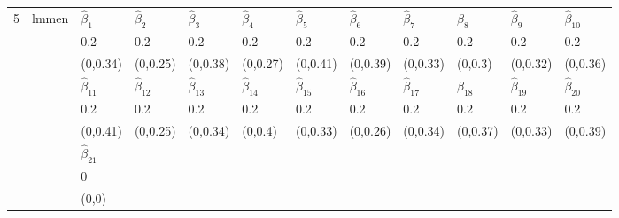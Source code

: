 \begin{table}[ht]
\centering
\begin{tabular}{llllllllllll}
  \hline
  \hline
\multirow{9}{*}{5} & \multirow{9}{*}{lmmen} & $\hat{\beta}_{1}$ & $\hat{\beta}_{2}$ & $\hat{\beta}_{3}$ & $\hat{\beta}_{4}$ & $\hat{\beta}_{5}$ & $\hat{\beta}_{6}$ & $\hat{\beta}_{7}$ & $\hat{\beta}_{8}$ & $\hat{\beta}_{9}$ & $\hat{\beta}_{10}$ \\ 
   &  & 0.2 & 0.2 & 0.2 & 0.2 & 0.2 & 0.2 & 0.2 & 0.2 & 0.2 & 0.2 \\ 
   &  & (0,0.34) & (0,0.25) & (0,0.38) & (0,0.27) & (0,0.41) & (0,0.39) & (0,0.33) & (0,0.3) & (0,0.32) & (0,0.36) \\ 
   &  & $\hat{\beta}_{11}$ & $\hat{\beta}_{12}$ & $\hat{\beta}_{13}$ & $\hat{\beta}_{14}$ & $\hat{\beta}_{15}$ & $\hat{\beta}_{16}$ & $\hat{\beta}_{17}$ & $\hat{\beta}_{18}$ & $\hat{\beta}_{19}$ & $\hat{\beta}_{20}$ \\ 
   &  & 0.2 & 0.2 & 0.2 & 0.2 & 0.2 & 0.2 & 0.2 & 0.2 & 0.2 & 0.2 \\ 
   &  & (0,0.41) & (0,0.25) & (0,0.34) & (0,0.4) & (0,0.33) & (0,0.26) & (0,0.34) & (0,0.37) & (0,0.33) & (0,0.39) \\ 
   &  & $\hat{\beta}_{21}$ &  &  &  &  &  &  &  &  &  \\ 
   &  & 0 &  &  &  &  &  &  &  &  &  \\ 
   &  & (0,0) &  &  &  &  &  &  &  &  &  \\ 
   \hline
\end{tabular}
\end{table}
